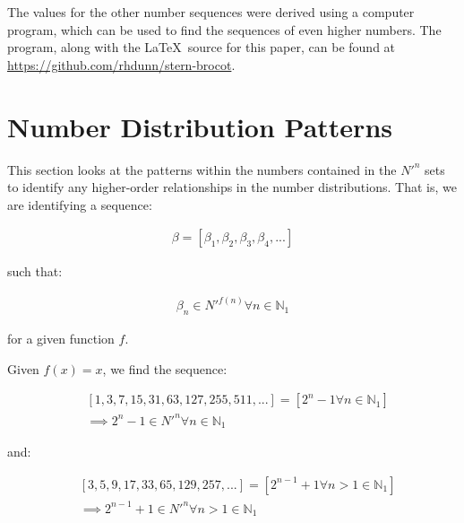 \documentclass{article}
\begin{document}
\noindent
The values for the other number sequences were derived using a computer
program, which can be used to find the sequences of even higher numbers.
The program, along with the \LaTeX\ source for this paper, can be found at
\url{https://github.com/rhdunn/stern-brocot}.

\section{Number Distribution Patterns}

This section looks at the patterns within the numbers contained in the
\begin{math}N'^n\end{math} sets to identify any higher-order relationships in
the number distributions. That is, we are identifying a sequence:

\begin{displaymath}\begin{aligned}
\beta = [\beta_1, \beta_2, \beta_3, \beta_4, ...]
\end{aligned}\end{displaymath}

\noindent
such that:

\begin{displaymath}\begin{aligned}
\beta_n \in N'^{f(n)} \forall n \in \mathbb{N}_{1}
\end{aligned}\end{displaymath}

\noindent
for a given function \begin{math}f\end{math}.

\noindent
Given \begin{math}f(x)=x\end{math}, we find the sequence:

\begin{displaymath}\begin{aligned}
& [1, 3, 7, 15, 31, 63, 127, 255, 511, ...] = [2^n-1 \forall n \in \mathbb{N}_{1}] \\
& \implies 2^n-1 \in N'^n \forall n \in \mathbb{N}_{1}
\end{aligned}\end{displaymath}

\noindent
and:

\begin{displaymath}\begin{aligned}
& [3, 5, 9, 17, 33, 65, 129, 257, ...] = [2^{n-1}+1 \forall n>1 \in \mathbb{N}_{1}] \\
& \implies 2^{n-1}+1 \in N'^n \forall n>1 \in \mathbb{N}_{1}
\end{aligned}\end{displaymath}
\end{document}
